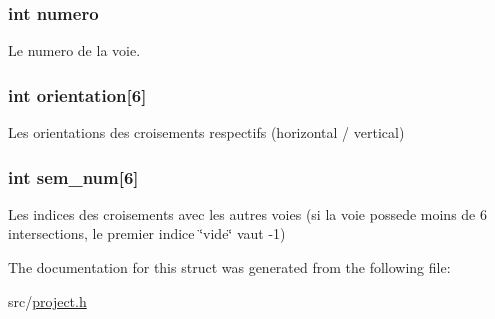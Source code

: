 \subsubsection[{numero}]{\setlength{\rightskip}{0pt plus 5cm}int numero}\label{struct_voie_a2c30f43104974e72e2809fb4569804b0}
Le numero de la voie. \hypertarget{struct_voie_a8c475c65666c2d5959930d639989450c}{}
\subsubsection[{orientation}]{\setlength{\rightskip}{0pt plus 5cm}int orientation\mbox{[}6\mbox{]}}\label{struct_voie_a8c475c65666c2d5959930d639989450c}
Les orientations des croisements respectifs (horizontal / vertical) \hypertarget{struct_voie_ac9436ae55f35dfc5e3dc8e676c73aeb5}{}
\subsubsection[{sem\+\_\+num}]{\setlength{\rightskip}{0pt plus 5cm}int sem\+\_\+num\mbox{[}6\mbox{]}}\label{struct_voie_ac9436ae55f35dfc5e3dc8e676c73aeb5}
Les indices des croisements avec les autres voies (si la voie possede moins de 6 intersections, le premier indice \char`\"{}vide\char`\"{} vaut -\/1) 

The documentation for this struct was generated from the following file\+:\begin{DoxyCompactItemize}
\item 
src/\hyperlink{project_8h}{project.\+h}\end{DoxyCompactItemize}
